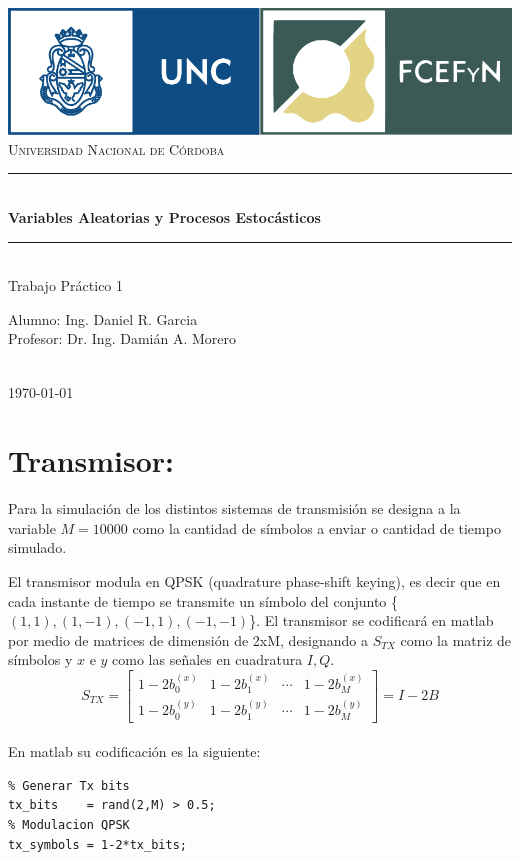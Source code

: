 \documentclass	[12pt,A4paper,titlepage]{article}
\begin{document}
\newcommand 	{\HRules}{\rule{\linewidth}{0.5mm}}
\newcommand 	{\HRulei}{\rule{\linewidth}{1mm}} 
\begin{titlepage}
\centering
\includegraphics[width=\textwidth]{./figuras/logo_unc.png}\\[1cm] 
\textsc			{\Large{Universidad Nacional de Córdoba}}\\ 
\bigskip
\HRules 		\\[0.5cm]
\Huge			{\textbf{Variables Aleatorias y Procesos Estocásticos}}\\
\HRulei 		\\[0.5cm]
\bigskip
\Huge   		{Trabajo Práctico 1}\\[1.5cm]
\begin{minipage}{\textwidth}
	\begin{center} 
		\large  {Alumno: Ing. Daniel R. Garcia}\\
		\large  {Profesor: Dr. Ing. Damián A. Morero}
	\end{center}
\end{minipage}
\\[1cm]         {\large \today}\\[1.5cm] \vfill
\end{titlepage}


\newpage
\section{Transmisor:}
Para la simulación de los distintos sistemas de transmisión se designa a la variable $M=10000$ como la cantidad de símbolos a enviar o cantidad de tiempo simulado.

El transmisor modula en QPSK (quadrature phase-shift keying), es decir que en cada instante de tiempo se transmite un símbolo del conjunto \{$(1, 1), (1, -1), (-1, 1), (-1,-1)$\}. El transmisor se codificará en matlab por medio de matrices de dimensión de 2xM, designando a $S_{TX}$ como la matriz de símbolos y $x$ e $y$ como las señales en cuadratura $I,Q$. 
\begin{equation}
S_{TX} = 
\begin{bmatrix}
	1-2b_0 ^{(x)} & 1-2b_1 ^{(x)} & \cdots & 1-2b_M ^{(x)} \\
	1-2b_0 ^{(y)} & 1-2b_1 ^{(y)} & \cdots & 1-2b_M ^{(y)}
\end{bmatrix}
=I-2B
\end{equation}
\\
En matlab su codificación es la siguiente:
\begin{verbatim}
% Generar Tx bits
tx_bits    = rand(2,M) > 0.5;
% Modulacion QPSK
tx_symbols = 1-2*tx_bits;
\end{verbatim}
\end{document}
